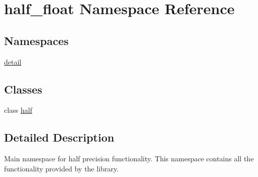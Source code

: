 \hypertarget{namespacehalf__float}{}\section{half\+\_\+float Namespace Reference}
\label{namespacehalf__float}
\subsection*{Namespaces}
\begin{DoxyCompactItemize}
\item 
 \hyperlink{namespacehalf__float_1_1detail}{detail}
\end{DoxyCompactItemize}
\subsection*{Classes}
\begin{DoxyCompactItemize}
\item 
class \hyperlink{classhalf__float_1_1half}{half}
\end{DoxyCompactItemize}


\subsection{Detailed Description}
Main namespace for half precision functionality. This namespace contains all the functionality provided by the library. 